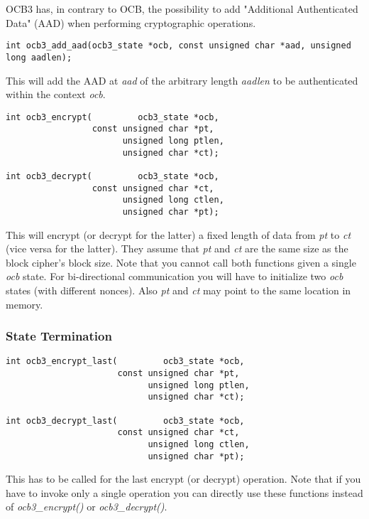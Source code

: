 \documentclass[synpaper]{book}
\begin{document}
OCB3 has, in contrary to OCB, the possibility to add "Additional Authenticated Data" (AAD) when performing cryptographic operations.

\begin{verbatim}
int ocb3_add_aad(ocb3_state *ocb, const unsigned char *aad, unsigned long aadlen);
\end{verbatim}

This will add the AAD at \textit{aad} of the arbitrary length \textit{aadlen} to be authenticated within the context \textit{ocb}.

 
\begin{verbatim}
int ocb3_encrypt(         ocb3_state *ocb,
                 const unsigned char *pt,
                       unsigned long ptlen,
                       unsigned char *ct);

int ocb3_decrypt(         ocb3_state *ocb,
                 const unsigned char *ct,
                       unsigned long ctlen,
                       unsigned char *pt);
\end{verbatim}

This will encrypt (or decrypt for the latter) a fixed length of data from \textit{pt} to \textit{ct} (vice versa for the latter).
They assume that \textit{pt} and \textit{ct} are the same size as the block cipher's block size.  Note that you cannot call
both functions given a single \textit{ocb} state.  For bi-directional communication you will have to initialize two \textit{ocb}
states (with different nonces).  Also \textit{pt} and \textit{ct} may point to the same location in memory.

\subsubsection{State Termination}

 
\begin{verbatim}
int ocb3_encrypt_last(         ocb3_state *ocb,
                      const unsigned char *pt,
                            unsigned long ptlen,
                            unsigned char *ct);

int ocb3_decrypt_last(         ocb3_state *ocb,
                      const unsigned char *ct,
                            unsigned long ctlen,
                            unsigned char *pt);
\end{verbatim}

This has to be called for the last encrypt (or decrypt) operation. Note that if you have to invoke only a single operation you can
directly use these functions instead of \textit{ocb3\_encrypt()} or \textit{ocb3\_decrypt()}.
\end{document}
